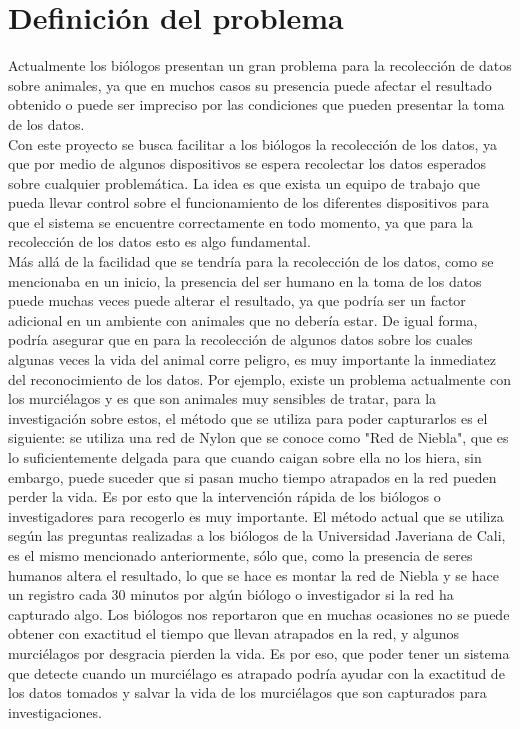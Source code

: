 
\section{Definición del problema}

Actualmente los biólogos presentan un gran problema para la recolección de datos sobre animales, ya que en muchos casos su presencia puede afectar el resultado obtenido o puede ser impreciso por las condiciones que pueden presentar la toma de los datos.  \\

Con este proyecto se busca facilitar a los biólogos la recolección de los datos, ya que por medio de algunos dispositivos se espera recolectar los datos esperados sobre cualquier problemática. La idea es que exista un equipo de trabajo que pueda llevar control sobre el funcionamiento de los diferentes dispositivos para que el sistema se encuentre correctamente en todo momento, ya que para la recolección de los datos esto es algo fundamental. \\

Más allá de la facilidad que se tendría para la recolección de los datos, como se mencionaba en un inicio, la presencia del ser humano en la toma de los datos puede muchas veces puede alterar el resultado, ya que podría ser un factor adicional en un ambiente con animales que no debería estar. De igual forma, podría asegurar que en para la recolección de algunos datos sobre los cuales algunas veces la vida del animal corre peligro, es muy importante la inmediatez del reconocimiento de los datos. Por ejemplo, existe un problema actualmente con los murciélagos y es que son animales muy sensibles de tratar, para la investigación sobre estos, el método que se utiliza para poder capturarlos es el siguiente: se utiliza una red de Nylon que se conoce como "Red de Niebla", que es lo suficientemente delgada para que cuando caigan sobre ella no los hiera, sin embargo, puede suceder que si pasan mucho tiempo atrapados en la red pueden perder la vida. Es por esto que la intervención rápida de los biólogos o investigadores para recogerlo es muy importante. El método actual que se utiliza según las preguntas realizadas a los biólogos de la Universidad Javeriana de Cali, es el mismo mencionado anteriormente, sólo que, como la presencia de seres humanos altera el resultado, lo que se hace es montar la red de Niebla y se hace un registro cada 30 minutos por algún biólogo o investigador si la red ha capturado algo. 
Los biólogos nos reportaron que en muchas ocasiones no se puede obtener con exactitud el tiempo que llevan atrapados en la red, y algunos murciélagos por desgracia pierden la vida. Es por eso, que poder tener un sistema que detecte cuando un murciélago es atrapado podría ayudar con la exactitud de los datos tomados y salvar la vida de los murciélagos que son capturados para investigaciones.

